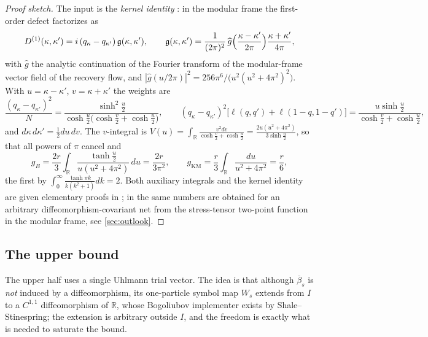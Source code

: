 \begin{proof}[Proof sketch]
The input is the \emph{kernel identity} \cite{RigorKI}: in the modular frame the
first-order defect factorizes as
\begin{equation}\label{eq:kernel-identity}
 D^{(1)}(\kappa,\kappa')=i\,(q_\kappa-q_{\kappa'})\,\mathfrak g(\kappa,\kappa'),
 \qquad
 \mathfrak g(\kappa,\kappa')
 =\frac1{(2\pi)^2}\,\widehat g\Bigl(\frac{\kappa-\kappa'}{2\pi}\Bigr)
 \frac{\kappa+\kappa'}{4\pi},
\end{equation}
with $\widehat g$ the analytic continuation of the Fourier transform of the
modular-frame vector field of the recovery flow, and
$|\widehat g(u/2\pi)|^2=256\pi^6/\bigl(u^2(u^2+4\pi^2)^2\bigr)$.  With
$u=\kappa-\kappa'$, $v=\kappa+\kappa'$ the weights are
\begin{equation}\label{eq:weights}
 \frac{(q_\kappa-q_{\kappa'})^2}{N}
 =\frac{\sinh^2\frac u2}{\cosh\frac u2\bigl(\cosh\frac v2+\cosh\frac u2\bigr)},
 \qquad
 (q_\kappa-q_{\kappa'})^2\bigl[\ell(q,q')+\ell(1-q,1-q')\bigr]
 =\frac{u\sinh\frac u2}{\cosh\frac v2+\cosh\frac u2},
\end{equation}
and $d\kappa\,d\kappa'=\frac12du\,dv$.  The $v$-integral is
$V(u)=\int_{\mathbb R}\frac{v^2dv}{\cosh\frac v2+\cosh\frac u2}
=\frac{2u(u^2+4\pi^2)}{3\sinh\frac u2}$, so that all powers of $\pi$ cancel and
\begin{equation}\label{eq:two-integrals}
 g_B=\frac{2r}3\int_{\mathbb R}\frac{\tanh\frac u2}{u(u^2+4\pi^2)}\,du
 =\frac{2r}{3\pi^2},
 \qquad
 g_{\mathrm{KM}}=\frac r3\int_{\mathbb R}\frac{du}{u^2+4\pi^2}=\frac r6 ,
\end{equation}
the first by $\int_0^\infty\frac{\tanh\pi k}{k(k^2+1)}dk=2$.  Both auxiliary
integrals and the kernel identity are given elementary proofs in
\cite{RigorQL,RigorKI}; in \cite{Note7} the same numbers are obtained for an
arbitrary diffeomorphism-covariant net from the stress-tensor two-point function
in the modular frame, see \cref{sec:outlook}.
\end{proof}

\subsection{The upper bound}
The upper half uses a single Uhlmann trial vector.  The idea is that although
$\overline\beta_s$ is \emph{not} induced by a diffeomorphism, its one-particle
symbol map $W_s$ extends from $I$ to a $C^{1,1}$ diffeomorphism of $\mathbb R$,
whose Bogoliubov implementer exists by Shale--Stinespring; the extension is
arbitrary outside $I$, and the freedom is exactly what is needed to saturate the
bound.

